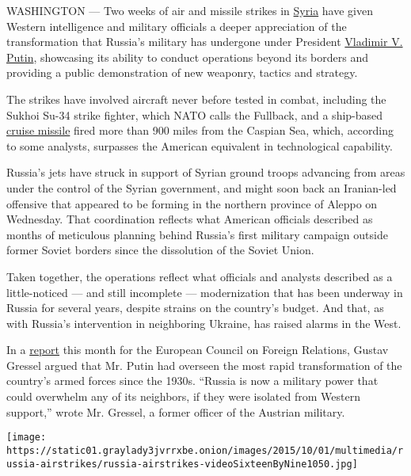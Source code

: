 WASHINGTON --- Two weeks of air and missile strikes in
\href{http://topics.nytimes3xbfgragh.onion/top/news/international/countriesandterritories/syria/index.html?inline=nyt-geo}{Syria}
have given Western intelligence and military officials a deeper
appreciation of the transformation that Russia's military has undergone
under President
\href{http://topics.nytimes3xbfgragh.onion/top/reference/timestopics/people/p/vladimir_v_putin/index.html?inline=nyt-per}{Vladimir
V. Putin}, showcasing its ability to conduct operations beyond its
borders and providing a public demonstration of new weaponry, tactics
and strategy.

The strikes have involved aircraft never before tested in combat,
including the Sukhoi Su-34 strike fighter, which NATO calls the
Fullback, and a ship-based
\href{http://www.nytimes3xbfgragh.onion/2015/10/09/world/middleeast/russias-kalibr-cruise-missiles-a-new-weapon-in-syria-conflict.html}{cruise
missile} fired more than 900 miles from the Caspian Sea, which,
according to some analysts, surpasses the American equivalent in
technological capability.

Russia's jets have struck in support of Syrian ground troops advancing
from areas under the control of the Syrian government, and might soon
back an Iranian-led offensive that appeared to be forming in the
northern province of Aleppo on Wednesday. That coordination reflects
what American officials described as months of meticulous planning
behind Russia's first military campaign outside former Soviet borders
since the dissolution of the Soviet Union.

Taken together, the operations reflect what officials and analysts
described as a little-noticed --- and still incomplete --- modernization
that has been underway in Russia for several years, despite strains on
the country's budget. And that, as with Russia's intervention in
neighboring Ukraine, has raised alarms in the West.

In a
\href{http://www.ecfr.eu/publications/summary/russias_quiet_military_revolution_and_what_it_means_for_europe}{report}
this month for the European Council on Foreign Relations, Gustav Gressel
argued that Mr. Putin had overseen the most rapid transformation of the
country's armed forces since the 1930s. ``Russia is now a military power
that could overwhelm any of its neighbors, if they were isolated from
Western support,'' wrote Mr. Gressel, a former officer of the Austrian
military.

\texttt{[image: https://static01.graylady3jvrrxbe.onion/images/2015/10/01/multimedia/russia-airstrikes/russia-airstrikes-videoSixteenByNine1050.jpg]}

